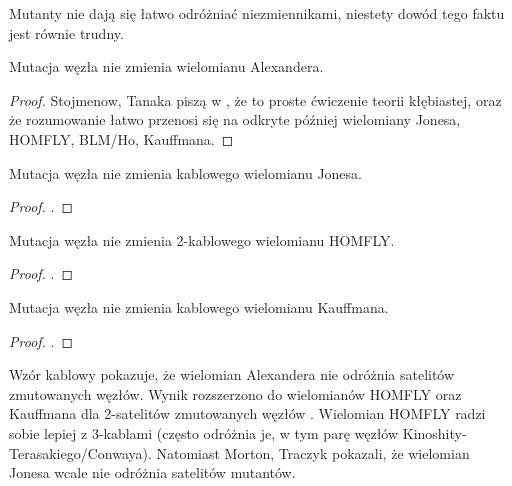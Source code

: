 Mutanty nie dają się łatwo odróżniać niezmiennikami, niestety dowód tego faktu jest równie trudny.

\begin{proposition}
    Mutacja węzła nie zmienia wielomianu Alexandera.
\end{proposition}

\begin{proof}
    Stojmenow, Tanaka piszą w \cite{tanaka09}, że to proste ćwiczenie teorii kłębiastej, oraz że rozumowanie łatwo przenosi się na odkryte później wielomiany Jonesa, HOMFLY, BLM/Ho, Kauffmana.
\end{proof}

\begin{proposition}
    Mutacja węzła nie zmienia kablowego wielomianu Jonesa.
\end{proposition}

\begin{proof}
    \cite{menasco91}.
\end{proof}

\begin{proposition}
\label{mutants_and_homfly}%
%
    Mutacja węzła nie zmienia 2-kablowego wielomianu HOMFLY.
\end{proposition}

\begin{proof}
    \cite{przytycki89}.
\end{proof}

\begin{proposition}
    Mutacja węzła nie zmienia kablowego wielomianu Kauffmana.
\end{proposition}

\begin{proof}
    \cite{lipson87}.
\end{proof}

Wzór kablowy \cite[tw. 6.15]{lickorish97} pokazuje, że wielomian Alexandera nie odróżnia satelitów zmutowanych węzłów.
Wynik rozszerzono do wielomianów HOMFLY oraz Kauffmana dla 2-satelitów zmutowanych węzłów \cite{lipson87}.
Wielomian HOMFLY radzi sobie lepiej z 3-kablami (często odróżnia je, w tym parę węzłów Kinoshity-Terasakiego/Conwaya).
Natomiast Morton, Traczyk \cite{traczyk88} pokazali, że wielomian Jonesa wcale nie odróżnia satelitów mutantów.

